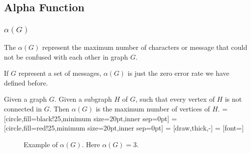 \subsection*{Alpha Function}

      \begin{frame}
            \frametitle{$\alpha(G)$}
            \begin{definition}[$\alpha(G)$]\label{def:alpha}
                  The $\alpha(G)$ represent the maximum number of characters or message that could not be confused with each other in graph $G$.

                  If $G$ represent a set of messages, $\alpha(G)$ is just the zero error rate we have defined before.

                  \pause

                  Given a graph $ G $. Given a subgraph $ H $ of $ G $, such that every vertex of $ H $ is not connected in $ G $. Then $ \alpha(G) $ is the maximum number of vertices of $ H $.
                  =[circle,fill=black!25,minimum size=20pt,inner sep=0pt]
                  =[circle,fill=red!25,minimum size=20pt,inner sep=0pt]
                   = [draw,thick,-]
                   = [font=\small]
                  \begin{figure}[h!]
                        \label{fig:alphaGExample}
                        \caption{Example of $ \alpha(G) $. Here $ \alpha(G) = 3 $.}
                  \end{figure}
            \end{definition}
      \end{frame}

